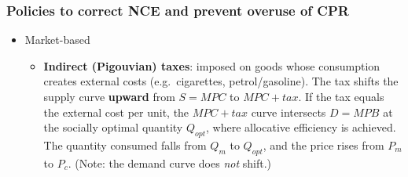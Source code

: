\documentclass[a4paper,12pt]{article}
\begin{document}
\subsubsection*{Policies to correct NCE and prevent overuse of CPR}
\begin{itemize}
  \item Market-based
  \begin{itemize}
    \item \textbf{Indirect (Pigouvian) taxes}: imposed on goods whose consumption creates external costs (e.g.\ cigarettes, petrol/gasoline). The tax shifts the supply curve \textbf{upward} from $S = MPC$ to $MPC + tax$. If the tax equals the external cost per unit, the $MPC + tax$ curve intersects $D = MPB$ at the socially optimal quantity $Q_{opt}$, where allocative efficiency is achieved. The quantity consumed falls from $Q_m$ to $Q_{opt}$, and the price rises from $P_m$ to $P_c$. (Note: the demand curve does \textit{not} shift.)


\end{itemize}
\end{itemize}
\end{document}
